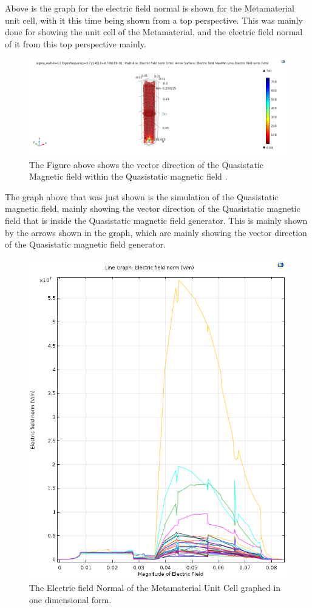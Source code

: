\documentclass[]{article}
\begin{document}
\noindent
Above is the graph for the electric field normal is shown for the Metamaterial unit cell, with it this time being shown from a top perspective. This was mainly done for showing the unit cell of the Metamaterial, and the electric field normal of it from this top perspective mainly. 
\begin{figure}[H]
	\centering
	\includegraphics[width=\textwidth]{QuasistaticMagneticFieldVectorDirectionGraphImages.png}
	\caption{The Figure above shows the vector direction of the Quasistatic Magnetic field within the Quasistatic magnetic field .}
	\label{test982}
\end{figure}
\noindent
The graph above that was just shown is the simulation of the Quasistatic magnetic field, mainly showing the vector direction of the Quasistatic magnetic field that is inside the Quasistatic magnetic field generator. This is mainly shown by the arrows shown in the graph, which are mainly showing the vector direction of the Quasistatic magnetic field generator. 
\begin{figure}[H]
	\centering
	\includegraphics[width=10.5 cm, height=10.5 cm]{OneDElectricFieldNormalGraphImage.png}
	\caption{The Electric field Normal of the Metamaterial Unit Cell graphed in one dimensional form.}
	\label{test8128382}
\end{figure}
\end{document}

